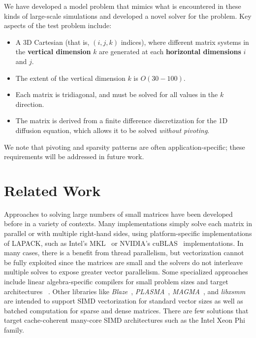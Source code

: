 \documentclass{sig-alternate-05-2015}
\begin{document}
We have developed a model problem that mimics what is encountered in these
  kinds of large-scale simulations and developed a novel solver for the problem.
Key aspects of the test problem include:
\begin{itemize}
\item A 3D Cartesian (that is, \((i,j,k)\) indices), where different matrix
  systems in the \textbf{vertical dimension} \(k\) are generated at each
  \textbf{horizontal dimensions} \(i\) and \(j\).
\item The extent of the vertical dimension \(k\) is \(O(30-100)\).
\item Each matrix is tridiagonal, and must be solved for all values in the
  \(k\) direction.
\item The matrix is derived from a finite difference discretization for the
  1D diffusion equation, which allows it to be solved \emph{without pivoting}.
\end{itemize}
We note that pivoting and sparsity patterns are often application-specific;
  these requirements will be addressed in future work.

\section{Related Work}
\label{sec:related_work}

Approaches to solving large numbers of small matrices have been 
  developed before in a variety of contexts.
Many implementations simply solve each matrix in parallel or with multiple
  right-hand sides, using platform-specific implementations of LAPACK, such as
  Intel's MKL~\cite{mkl_website} or NVIDIA's cuBLAS~\cite{cublas_website}
  implementations.
In many cases, there is a benefit from thread parallelism, 
  but vectorization cannot be fully exploited since the matrices are small and
  the solvers do not interleave multiple solves to expose greater vector
  parallelism.
Some specialized approaches include linear algebra-specific 
  compilers for small problem sizes and target architectures 
 ~\cite{Spampinato:2014, NelsonEtAl_2015}.
Other libraries like 
  \emph{Blaze}~\cite{BlazeSite}, 
  \emph{PLASMA}~\cite{PLASMASite},
  \emph{MAGMA}~\cite{Haidar:2015}, and 
  \emph{libxsmm}~\cite{libxsmm_website}
  are intended to support SIMD vectorization for standard vector sizes
  as well as batched computation for sparse and dense matrices.
There are few solutions that target cache-coherent many-core SIMD architectures
  such as the Intel Xeon Phi family.
\end{document}
